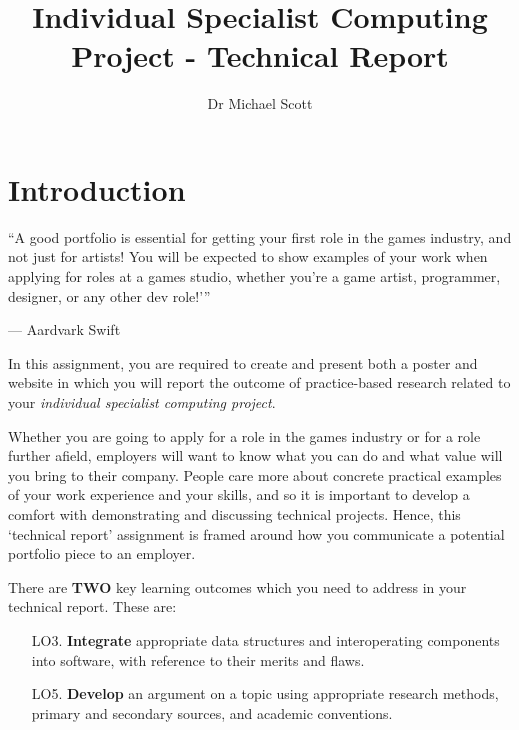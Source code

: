 \documentclass{../../fal_assignment}
\title{Individual Specialist Computing Project - Technical Report}
\author{Dr Michael Scott}
\begin{document}
\maketitle

\section*{Introduction}

\begin{marginquote}
``A good portfolio is essential for getting your first role in the games industry, and not just for artists! You will be expected to show examples of your work when applying for roles at a games studio, whether you’re a game artist, programmer, designer, or any other dev role!'\thinspace''

--- Aardvark Swift
\end{marginquote}

In this assignment, you are required to create and present both a poster and website in which you will report the outcome of practice-based research related to your \textit{individual specialist computing project}.

Whether you are going to apply for a role in the games industry or for a role further afield, employers will want to know what you can do and what value will you bring
to their company. People care more about concrete practical examples of your work experience and your skills, and so it is important to develop a comfort with demonstrating
and discussing technical projects. Hence, this `technical report' assignment is framed around how you communicate a potential portfolio piece to an employer.
 
There are \textbf{TWO} key learning outcomes which you need to address in your technical report. These are:

\begin{itemize}
	\setlength{\itemindent}{1em}
	\item[LO3. ] \textbf{Integrate} appropriate data structures and interoperating components into software, with reference to their merits and flaws.
	\item[LO5. ] \textbf{Develop} an argument on a topic using appropriate research methods, primary and secondary sources, and academic conventions.
\end{itemize}
\end{document}
